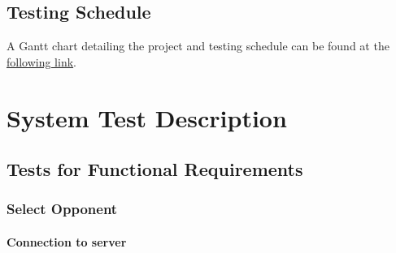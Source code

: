 \documentclass[12pt, titlepage]{article}
\begin{document}
\subsection{Testing Schedule}
		
A Gantt chart detailing the project and testing schedule can be found at the \href{https://gitlab.cas.mcmaster.ca/celsj/3xa3-group2-chess/-/blob/master/ProjectSchedule/3XA3_ProjectSchedule.pdf}{following link}. 

\section{System Test Description}
	
\subsection{Tests for Functional Requirements}

\subsubsection{Select Opponent}
		
    \paragraph{Connection to server}
    
\end{document}
